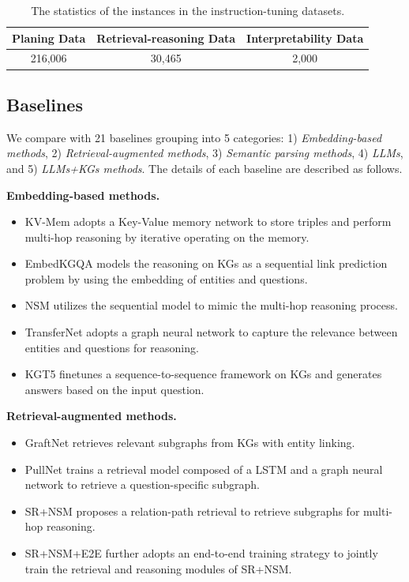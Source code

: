 \begin{table}[]
    \centering
    \caption{The statistics of the instances in the instruction-tuning datasets.}
    \label{tab:it-data}
    \begin{tabular}{@{}ccc@{}}
        \toprule
        Planing Data & Retrieval-reasoning Data & Interpretability Data \\ \midrule
        216,006      & 30,465                   & 2,000                 \\ \bottomrule
    \end{tabular}%
\end{table}


\subsection{Baselines}\label{app:baselines}


We compare \ourmethod with 21 baselines grouping into 5 categories: 1) \emph{Embedding-based methods}, 2) \emph{Retrieval-augmented methods}, 3) \emph{Semantic parsing methods}, 4) \emph{LLMs}, and 5) \emph{LLMs+KGs methods}. The details of each baseline are described as follows.

\noindent\textbf{Embedding-based methods.}
\begin{itemize}
    \item KV-Mem \citep{miller2016key} adopts a Key-Value memory network to store triples and perform multi-hop reasoning by iterative operating on the memory.
    \item EmbedKGQA \citep{saxena2020improving} models the reasoning on KGs as a sequential link prediction problem by using the embedding of entities and questions.
    \item NSM \citep{he2021improving} utilizes the sequential model to mimic the multi-hop reasoning process.
    \item TransferNet \citep{shi2021transfernet} adopts a graph neural network to capture the relevance between entities and questions for reasoning.
    \item KGT5 \citep{saxena2022sequence} finetunes a sequence-to-sequence framework on KGs and generates answers based on the input question.
\end{itemize}

\noindent\textbf{Retrieval-augmented methods.}
\begin{itemize}
    \item GraftNet \citep{sun2018open} retrieves relevant subgraphs from KGs with entity linking.
    \item PullNet \citep{sun2019pullnet} trains a retrieval model composed of a LSTM and a graph neural network to retrieve a question-specific subgraph.
    \item SR+NSM \citep{zhang2022subgraph} proposes a relation-path retrieval to retrieve subgraphs for multi-hop reasoning.
    \item SR+NSM+E2E \citep{zhang2022subgraph} further adopts an end-to-end training strategy to jointly train the retrieval and reasoning modules of SR+NSM.
\end{itemize}

